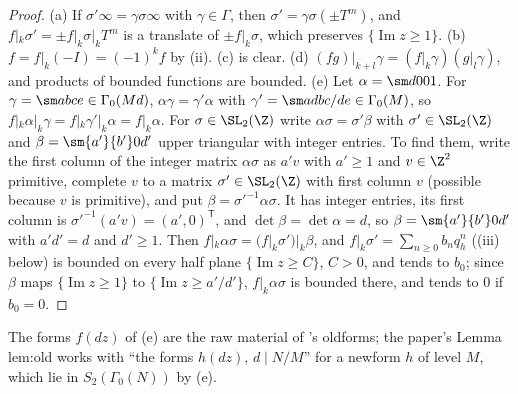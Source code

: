 \begin{proof}
(a) If $\sigma'\infty=\gamma\sigma\infty$ with $\gamma\in\Gamma$, then $\sigma'=\gamma\sigma(\pm T^m)$, and $f|_k\sigma'=\pm f|_k\sigma|_kT^m$ is a translate of $\pm f|_k\sigma$, which preserves
$\{\operatorname{Im}z\ge1\}$. (b) $f=f|_k(-I)=(-1)^kf$ by (ii). (c) is clear. (d) $(fg)|_{k+l}\gamma=(f|_k\gamma)(g|_l\gamma)$, and products of bounded
functions are bounded. (e) Let $\alpha=\sm d001$. For $\gamma=\sm abce\in\Gamma_0(Md)$, $\alpha\gamma=\gamma'\alpha$ with $\gamma'=\sm a{db}{c/d}e\in\Gamma_0(M)$, so
$f|_k\alpha|_k\gamma=f|_k\gamma'|_k\alpha=f|_k\alpha$. For $\sigma\in\SL_2(\Z)$ write $\alpha\sigma=\sigma'\beta$ with $\sigma'\in\SL_2(\Z)$ and $\beta=\sm{a'}{b'}0{d'}$ upper triangular with
integer entries. To find them, write the first column of the integer matrix $\alpha\sigma$ as $a'v$ with $a'\ge1$ and $v\in\Z^2$ primitive, complete $v$ to a matrix
$\sigma'\in\SL_2(\Z)$ with first column $v$ (possible because $v$ is primitive), and put $\beta=\sigma'^{-1}\alpha\sigma$. It has integer entries, its first column is
$\sigma'^{-1}(a'v)=(a',0)^{\mathsf T}$, and $\det\beta=\det\alpha=d$, so $\beta=\sm{a'}{b'}0{d'}$ with $a'd'=d$ and $d'\ge1$. Then $f|_k\alpha\sigma=(f|_k\sigma')|_k\beta$, and
$f|_k\sigma'=\sum_{n\ge0}b_nq_h^n$ ((iii) below) is bounded on every half plane $\{\operatorname{Im}z\ge C\}$, $C>0$, and tends to $b_0$; since $\beta$ maps
$\{\operatorname{Im}z\ge1\}$ to $\{\operatorname{Im}z\ge a'/d'\}$, $f|_k\alpha\sigma$ is bounded there, and tends to $0$ if $b_0=0$.
\end{proof}

The forms $f(dz)$ of (e) are the raw material of 's oldforms; the paper's Lemma lem:old works with ``the forms $h(dz)$, $d\mid N/M$'' for a newform
$h$ of level $M$, which lie in $S_2(\Gamma_0(N))$ by (e).

